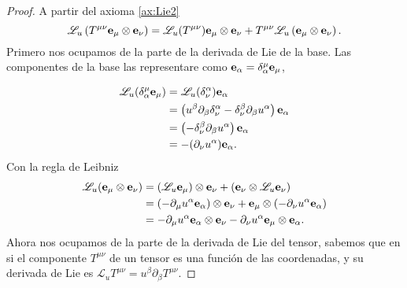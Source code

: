 \begin{proof}
    A partir del axioma \ref{ax:Lie2}
\begin{equation}
    \mathscr{L}_u \left( T^{\mu \nu} \mathbf{e_\mu} \otimes \mathbf{e_\nu} \right) = \mathscr{L}_u(T^{\mu \nu}) \mathbf{e_\mu} \otimes \mathbf{e_\nu} + T^{\mu \nu} \mathscr{L}_u \left( \mathbf{e_\mu} \otimes \mathbf{e_\nu} \right).
\end{equation}
Primero nos ocupamos de la parte de la derivada de Lie de la base.
Las componentes de la base las representare como $\mathbf{e_\alpha} = \delta^\mu_\alpha \mathbf{e_\mu} $,


\begin{equation}
    \begin{aligned}
        \mathscr{L}_u (\delta^\mu_\alpha \mathbf{e_\mu})& = \mathscr{L}_u (\delta^\alpha_\nu) \mathbf{e_\alpha} \\
        &= \left( u^\beta \partial_\beta \delta^\alpha_\nu - \delta^\beta_\nu \partial_\beta u^\alpha \right) \mathbf{e_\alpha} \\
        &= \left(  - \delta^\beta_\nu \partial_\beta u^\alpha \right) \mathbf{e_\alpha}                                         \\
        &   = - (\partial_\nu u^\alpha) \mathbf{e_\alpha}   .                                                                           \\
    \end{aligned}
\end{equation}
Con la regla de Leibniz
\begin{equation}
    \begin{aligned}
        \mathscr{L}_u (\mathbf{e_\mu} \otimes \mathbf{e_\nu}) & = (\mathscr{L}_u \mathbf{e_\mu}) \otimes  \mathbf{e_\nu} +(\mathbf{e_\nu}\otimes\mathscr{L}_u \mathbf{e_\nu})                                                     \\
                                                    & = \left( - \partial_\mu u^\alpha \mathbf{e_\alpha} \right) \otimes  \mathbf{e_\nu} + \mathbf{e_\mu}\otimes\left( - \partial_\nu u^\alpha \mathbf{e_\alpha} \right) \\
                                                    & = - \partial_\mu u^\alpha \mathbf{e_\alpha} \otimes  \mathbf{e_\nu} - \partial_\nu u^\alpha \mathbf{e_\mu}\otimes\mathbf{e_\alpha}      .                           \\
    \end{aligned}
\end{equation}
Ahora nos ocupamos de la parte de la derivada de Lie del tensor, sabemos que en si el componente $T^{\mu \nu}$ de un tensor es una función de las coordenadas, y su derivada de Lie es $\mathscr{L}_u T^{\mu \nu} = u^\beta \partial_\beta T^{\mu \nu} $.


\end{proof}
